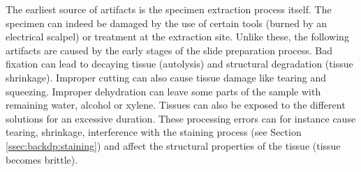 The earliest source of artifacts is the specimen extraction process itself. The specimen can indeed be damaged by the use of certain tools (\eg burned by an electrical scalpel) or treatment at the extraction site. Unlike these, the following artifacts are caused by the early stages of the slide preparation process. Bad fixation can lead to decaying tissue (\ie autolysis) and structural degradation (\eg tissue shrinkage). Improper cutting can also cause tissue damage like tearing and squeezing. Improper dehydration can leave some parts of the sample with remaining water, alcohol or xylene. Tissues can also be exposed to the different solutions for an excessive duration. These processing errors can for instance cause tearing, shrinkage, interference with the staining process (see Section \ref{ssec:backdp:staining}) and affect the structural properties of the tissue (\eg tissue becomes brittle).

